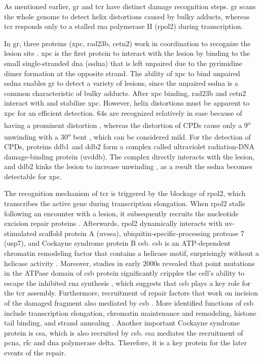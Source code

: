 As mentioned earlier, \gls{gr} and \gls{tcr} have distinct damage recognition steps. \gls{gr} scans the whole genome to detect helix distortions caused by bulky adducts, whereas \gls{tcr} responds only to a stalled \gls{rna} polymerase II (\gls{rpol2}) during transcription. 

In \gls{gr}, three proteins (\gls{xpc}, \gls{rad23b}, \gls{cetn2}) work in coordination to recognize the lesion site \citep{sugasawa1998xeroderma}. \gls{xpc} is the first protein to interact with the lesion by binding to the small single-stranded \gls{dna} (\gls{ssdna}) that is left unpaired due to the pyrimidine dimer formation at the opposite strand. The ability of \gls{xpc} to bind unpaired \gls{ssdna} enables \gls{gr} to detect a variety of lesions, since the unpaired \gls{ssdna} is a common characteristic of bulky adducts. After \gls{xpc} binding, \gls{rad23b} and \gls{cetn2} interact with and stabilize \gls{xpc}. However, helix distortions must be apparent to \gls{xpc} for an efficient detection. \gls{64}s are recognized relatively in ease because of having a prominent distortion \citep{mizukoshi2001structural}, whereas the distortion of \gls{CPD}s cause only a 9\textsuperscript{o} unwinding with a 30\textsuperscript{o} bent \citep{park2002crystal}, which can be considered mild. For the detection of \gls{CPD}s, proteins \gls{ddb1} and \gls{ddb2} form a complex called ultraviolet radiation-DNA damage-binding protein (\gls{uvddb}). The complex directly interacts with the lesion, and \gls{ddb2} kinks the lesion to increase unwinding \citep{scrima2008structural}, as a result the \gls{ssdna} becomes detectable for \gls{xpc}. 

The recognition mechanism of \gls{tcr} is triggered by the blockage of \gls{rpol2}, which transcribes the active gene during transcription elongation. When \gls{rpol2} stalls following an encounter with a lesion, it subsequently recruits the nucleotide excision repair proteins \citep{svejstrup2002mechanisms}. Afterwards, \gls{rpol2} dynamically interacts with \gls{uv}-stimulated scaffold protein A (\gls{uvssa}), ubiquitin-specific-processing protease 7 (\gls{usp7}), and Cockayne syndrome protein B \gls{csb}. \gls{csb} is an ATP-dependent chromatin remodeling factor that contains a helicase motif, surprisingly without a helicase activity \citep{selby1997human}. Moreover, studies in early 2000s revealed that point mutations in the ATPase domain of \gls{csb} protein significantly cripples the cell’s ability to escape the inhibited \gls{rna} synthesis \citep{citterio1998biochemical,muftuoglu2002phenotypic}, which suggests that \gls{csb} plays a key role for the \gls{tcr} assembly. Furthermore, recruitment of repair factors that work on incision of the damaged fragment also mediated by \gls{csb} \citep{fousteri2006cockayne}. More identified functions of \gls{csb} include transcription elongation, chromatin maintenance and remodeling, histone tail binding, and strand annealing \citep{selby1997cockayne}. Another important Cockayne syndrome protein is \gls{csa}, which is also recruited by \gls{csb}. \gls{csa} mediates the recruitment of \gls{pcna}, \gls{rfc} and \gls{dna} polymerase \gls{delta}. Therefore, it is a key protein for the later events of the repair.

